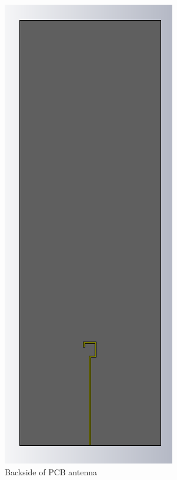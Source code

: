 \begin{figure}[H]
\begin{minipage}[b]{0.4\textwidth}
\includegraphics[scale = 0.7]{figures/measurement/antenna_back.png}
\caption{Backside of PCB antenna}
    \label{fig:ant_back}
  \end{minipage}
\end{figure}



